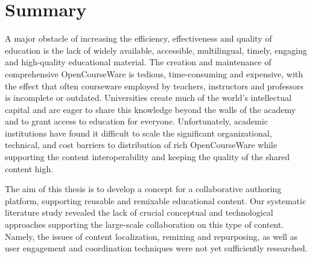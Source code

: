\documentclass[PhD, Submit, ngerman,UKenglish,table]{scrbook}
\begin{document}
%


\nobibliography*

% 
% 
% 

\frontmatter
 \dedication{For Siberia, which gave me my spirit and for my mom, who taught me how to govern it}

 
% 

\pagestyle{scrplain}



\chapter*{Summary}

A major obstacle of increasing the efficiency, effectiveness and quality of education is the lack of widely available, accessible, multilingual, timely, engaging and high-quality educational material.
The creation and maintenance of comprehensive OpenCourseWare is tedious, time-consuming and expensive, with the effect that often courseware employed by teachers, instructors and professors is incomplete or outdated.
Universities create much of the world's intellectual capital and are eager to share this knowledge beyond the walls of the academy and to grant access to education for everyone.
Unfortunately, academic institutions have found it difficult to scale the significant organizational, technical, and cost barriers to distribution of rich OpenCourseWare while supporting the content interoperability and keeping the quality of the shared content high. 

The aim of this thesis is to develop a concept for a collaborative authoring platform, supporting reusable and remixable educational content.
Our systematic literature study revealed the lack of crucial conceptual and technological approaches supporting the large-scale collaboration on this type of content.
Namely, the issues of content localization, remixing and repurposing, as well as user engagement and coordination techniques were not yet sufficiently researched.
\end{document}

